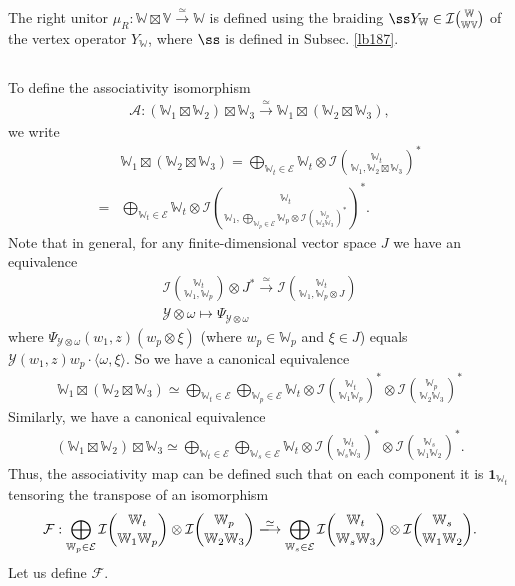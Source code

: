 \documentclass[12pt,a4paper,notitlepage]{article}
\theoremstyle{definition}
\theoremstyle{plain}
\newcommand{\mc}{\mathcal}
\newcommand{\id}{\mathbf{1}}
\newcommand{\bk}[1]{\langle {#1}\rangle}
\newcommand{\Vbb}{\mathbb V}
\newcommand{\Wbb}{\mathbb W}
\numberwithin{equation}{section}
\begin{document}
The right unitor $\mu_R:\Wbb\boxtimes\Vbb\xrightarrow{\simeq}\Wbb$ is defined using the braiding $\ss Y_\Wbb\in\mc I{\Wbb\choose\Wbb\Vbb}$ of the vertex operator $Y_\Wbb$, where $\ss$ is defined in Subsec. \ref{lb187}.

\subsection{}

To define the associativity isomorphism
\begin{align*}
\mc A:(\Wbb_1\boxtimes\Wbb_2)\boxtimes\Wbb_3\xrightarrow{\simeq}\Wbb_1\boxtimes(\Wbb_2\boxtimes\Wbb_3),
\end{align*}
we write
\begin{align*}
&\Wbb_1\boxtimes(\Wbb_2\boxtimes\Wbb_3)=\bigoplus_{\Wbb_t\in\mc E}\Wbb_t\otimes\mc I{\Wbb_t\choose \Wbb_1,\Wbb_2\boxtimes\Wbb_3}^*\\
=&\bigoplus_{\Wbb_t\in\mc E}\Wbb_t\otimes\mc I{\Wbb_t\choose \Wbb_1,\bigoplus_{\Wbb_p\in\mc E}\Wbb_p\otimes\mc I{\Wbb_p\choose\Wbb_2\Wbb_3}^*}^*.
\end{align*}
Note that in general, for any finite-dimensional vector space $J$ we have an equivalence
\begin{gather*}
\mc I{\Wbb_t\choose \Wbb_1,\Wbb_p}\otimes J^*\xrightarrow{\simeq}\mc I{\Wbb_t\choose \Wbb_1,\Wbb_p\otimes J}\\
\mc Y\otimes\omega\mapsto \Psi_{\mc Y\otimes\omega}
\end{gather*}
where $\Psi_{\mc Y\otimes\omega}(w_1,z)(w_p\otimes \xi)$ (where $w_p\in\Wbb_p$ and $\xi\in J$) equals $\mc Y(w_1,z)w_p\cdot \bk{\omega,\xi}$. So we have a canonical equivalence
\begin{align}
\Wbb_1\boxtimes(\Wbb_2\boxtimes\Wbb_3)\simeq \bigoplus_{\Wbb_t\in\mc E}\bigoplus_{\Wbb_p\in\mc E}\Wbb_t\otimes \mc I{\Wbb_t\choose \Wbb_1\Wbb_p}^*\otimes \mc I{\Wbb_p\choose\Wbb_2\Wbb_3}^*
\end{align}
Similarly, we have a canonical equivalence
\begin{align}
(\Wbb_1\boxtimes\Wbb_2)\boxtimes\Wbb_3\simeq\bigoplus_{\Wbb_t\in\mc E}\bigoplus_{\Wbb_s\in\mc E}\Wbb_t\otimes\mc I{\Wbb_t\choose \Wbb_s\Wbb_3}^*\otimes\mc I{\Wbb_s\choose \Wbb_1\Wbb_2}^*.
\end{align}
Thus, the associativity map can be defined such that on each component it is  $\id_{\Wbb_t}$ tensoring the transpose of an  isomorphism
\begin{align}
\mc F:\bigoplus_{\Wbb_p\in\mc E}\mc I{\Wbb_t\choose \Wbb_1\Wbb_p}\otimes \mc I{\Wbb_p\choose\Wbb_2\Wbb_3}\xlongrightarrow{\simeq}\bigoplus_{\Wbb_s\in\mc E}\mc I{\Wbb_t\choose \Wbb_s\Wbb_3}\otimes\mc I{\Wbb_s\choose \Wbb_1\Wbb_2}.\label{eq260}
\end{align}
Let us define $\mc F$.
\end{document}
